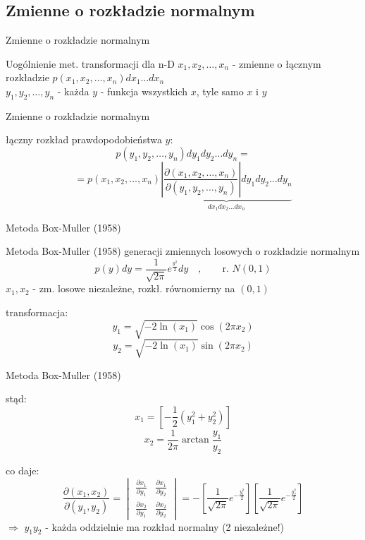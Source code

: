 \subsection{Zmienne o rozkładzie normalnym}
\begin{frame}{Zmienne o rozkładzie normalnym}
	\begin{block}{Uogólnienie met. transformacji dla n-D}
		$x_{1},x_{2},\ldots,x_{n}$ - zmienne o łącznym rozkładzie $p(x_{1},x_{2},\ldots,x_{n})dx_{1} \ldots dx_{n}$\\
		\vspace{0.5cm}
		$y_{1},y_{2},\ldots,y_{n}$ - każda $y$ - funkcja wszystkich $x$, tyle samo $x$ i $y$
	\end{block}
\end{frame}

\begin{frame}{Zmienne o rozkładzie normalnym}
	\begin{block}{łączny rozkład prawdopodobieństwa $y$:}
		\[
			p(y_{1},y_{2},\ldots,y_{n})dy_{1}dy_{2} \ldots dy_{n} =
		\]
		\[
			= p(x_{1},x_{2},\ldots,x_{n}) \underbrace{\left|\frac{\partial(x_{1},x_{2},\ldots,x_{n})}{\partial(y_{1},y_{2},\ldots,y_{n})}\right| dy_{1}dy_{2} \ldots dy_{n}}_{dx_{1}dx_{2} \ldots dx_{n}}
		\]
	\end{block}
\end{frame}
\begin{frame}{Metoda Box-Muller (1958)}
	\begin{block}{Metoda Box-Muller (1958) generacji zmiennych losowych o rozkładzie normalnym}
		\[
			p(y)dy = \frac{1}{\sqrt{2\pi}}e^{\frac{y^{2}}{2}}dy \quad, \qquad \text{r. } N(0,1)
		\]
		$x_{1}, x_{2}$ - zm. losowe niezależne, rozkł. równomierny na $(0, 1)$
	\end{block}

	\begin{block}{transformacja:}
		\[
			y_{1} = \sqrt{-2 \ln(x_{1})} \cos(2\pi x_{2})
		\]
		\[
			y_{2} = \sqrt{-2 \ln(x_{1})} \sin(2\pi x_{2})
		\]
	\end{block}
\end{frame}
\begin{frame}{Metoda Box-Muller (1958)}
	\begin{block}{stąd:}
		\[
			x_{1} = \left[- \frac{1}{2} (y_{1}^{2} + y_{2}^{2})\right]
		\]
		\[
			x_{2} = \frac{1}{2\pi} \arctan\frac{y_{1}}{y_{2}}
		\]
	\end{block}
	
	\begin{block}{co daje:}
		\[
			\frac{\partial(x_{1}, x_{2})}{\partial(y_{1}, y_{2})} = \begin{vmatrix}
				\frac{\partial x_{1}}{\partial y_{1}} & \frac{\partial x_{1}}{\partial y_{2}} \\
				\frac{\partial x_{2}}{\partial y_{1}} & \frac{\partial x_{2}}{\partial y_{2}}
			\end{vmatrix} =
			- \left[\frac{1}{\sqrt{2\pi}} e^{-\frac{y_{1}^{2}}{2}}\right] \left[\frac{1}{\sqrt{2\pi}} e^{-\frac{y_{2}^{2}}{2}}\right]
		\]
		$\Rightarrow$ $y_{1} y_{2}$ - każda oddzielnie ma rozkład normalny (2 niezależne!)
	\end{block}
\end{frame}
